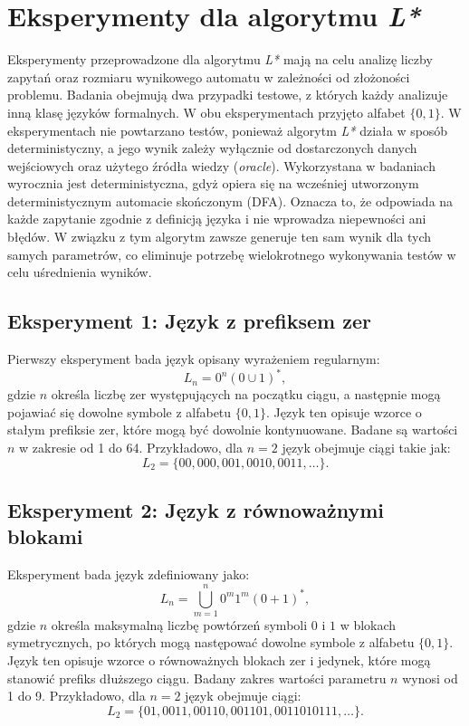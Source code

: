\section{Eksperymenty dla algorytmu \textit{L*}}
Eksperymenty przeprowadzone dla algorytmu \textit{L*} mają na celu analizę liczby zapytań oraz rozmiaru wynikowego automatu w zależności od złożoności problemu. Badania obejmują dwa przypadki testowe, z których każdy analizuje inną klasę języków formalnych. W obu eksperymentach przyjęto alfabet \(\{0, 1\}\). 
W eksperymentach nie powtarzano testów, ponieważ algorytm \textit{L*} działa w sposób deterministyczny, a jego wynik zależy wyłącznie od dostarczonych danych wejściowych oraz użytego źródła wiedzy (\textit{oracle}). Wykorzystana w badaniach wyrocznia jest deterministyczna, gdyż opiera się na wcześniej utworzonym deterministycznym automacie skończonym (DFA). Oznacza to, że odpowiada na każde zapytanie zgodnie z definicją języka i nie wprowadza niepewności ani błędów. W związku z tym algorytm zawsze generuje ten sam wynik dla tych samych parametrów, co eliminuje potrzebę wielokrotnego wykonywania testów w celu uśrednienia wyników.

\subsection{Eksperyment 1: Język z prefiksem zer}
\label{sec:eksperyment1}

Pierwszy eksperyment bada język opisany wyrażeniem regularnym:  
\[
L_n = 0^n(0 \cup 1)^*,
\]  
gdzie \( n \) określa liczbę zer występujących na początku ciągu, a następnie mogą pojawiać się dowolne symbole z alfabetu \(\{0, 1\}\). Język ten opisuje wzorce o stałym prefiksie zer, które mogą być dowolnie kontynuowane. Badane są wartości \( n \) w zakresie od 1 do 64. Przykładowo, dla \( n = 2 \) język obejmuje ciągi takie jak:  
\[
L_2 = \{00, 000, 001, 0010, 0011, \ldots \}.
\]  

\subsection{Eksperyment 2: Język z równoważnymi blokami} 
\label{sec:eksperyment2}

Eksperyment bada język zdefiniowany jako:  
\[
L_n = \bigcup_{m=1}^{n} 0^m 1^m(0 + 1)^*,
\]  
gdzie \( n \) określa maksymalną liczbę powtórzeń symboli \( 0 \) i \( 1 \) w blokach symetrycznych, po których mogą następować dowolne symbole z alfabetu \(\{0, 1\}\). Język ten opisuje wzorce o równoważnych blokach zer i jedynek, które mogą stanowić prefiks dłuższego ciągu. Badany zakres wartości parametru \( n \) wynosi od 1 do 9. Przykładowo, dla \( n = 2 \) język obejmuje ciągi:  
\[
L_2 = \{01, 0011, 00110, 001101, 0011010111, \ldots\}.
\]

